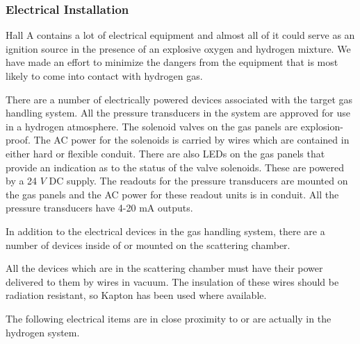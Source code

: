 {\begin{safetyen}{10}{5}
\subsubsection{ Electrical Installation}

Hall A contains a lot of electrical equipment and almost all of it
could serve as an ignition source in the presence of an explosive
oxygen and hydrogen mixture. We have made an effort to minimize the dangers
from the equipment that is most likely to come into contact with
hydrogen gas.

There are a number of electrically powered devices associated with the
target gas handling system.
All the pressure transducers in the system are approved
for use in a hydrogen atmosphere. 
The solenoid valves on the gas panels are explosion-proof.
The AC power for the solenoids is
carried by wires which are contained in either hard or flexible conduit.
There are also LEDs on the gas panels that provide an indication as to the
status of the valve solenoids. These are powered by a 24 $V$ DC supply.
The readouts for the pressure transducers are
mounted on the gas panels and the AC power for these readout units
is in conduit. All the pressure transducers have 4-20 mA outputs.

In addition to the electrical devices in the gas handling system,
there are a number of devices inside of or mounted on the scattering
chamber.

All the devices which are in the scattering chamber must have
their power delivered to them by wires in vacuum. The
insulation of these wires should be radiation resistant, so Kapton
has been used where available.

The following electrical items are in close proximity to
or are actually in the hydrogen system.


\end{safetyen}}
